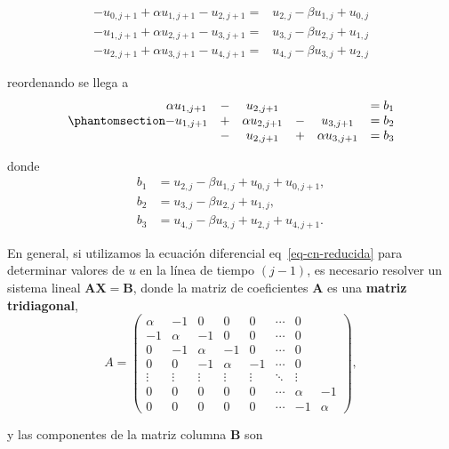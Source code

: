 \documentclass[
  spanish,
  us-letterpaper,
  DIV=11,
  numbers=noendperiod]{scrreprt}
\theoremstyle{definition}
\theoremstyle{plain}
\theoremstyle{remark}
\begin{document}
\[
\begin{split}
-u_{0,j+1} + \alpha u_{1,j+1} - u_{2,j+1} =& u_{2,j} - \beta u_{1,j} + u_{0,j} \\
-u_{1,j+1} + \alpha u_{2,j+1} - u_{3,j+1} =& u_{3,j} - \beta u_{2,j} + u_{1,j} \\
-u_{2,j+1} + \alpha u_{3,j+1} - u_{4,j+1} =& u_{4,j} - \beta u_{3,j} + u_{2,j}
\end{split}
\]

reordenando se llega a
\begin{equation}\phantomsection\label{eq-cn-matrix}{
\begin{matrix}
\alpha u_{1,j+1} &-& u_{2,j+1}&& &= b_1 \\
-u_{1,j+1} &+& \alpha u_{2,j+1} &-& u_{3,j+1} &= b_2 \\
&-&u_{2,j+1} &+& \alpha u_{3,j+1} &= b_3
\end{matrix}
}\end{equation}

donde \begin{align*}
b_1 &= u_{2,j} - \beta u_{1,j} + u_{0,j} + u_{0,j+1}, \\
b_2 &= u_{3,j} - \beta u_{2,j} + u_{1,j}, \\
b_3 &= u_{4,j} - \beta u_{3,j} + u_{2,j} + u_{4,j+1}.
\end{align*}

En general, si utilizamos la ecuación diferencial
eq~\ref{eq-cn-reducida} para determinar valores de \(u\) en la línea de
tiempo \((j -1)\), es necesario resolver un sistema lineal
\(\mathbf{AX=B}\), donde la matriz de coeficientes \(\mathbf{A}\) es una
\textbf{matriz tridiagonal}, \[
A = 
\begin{pmatrix}
\alpha & -1    & 0      & 0      & 0      & \cdots & 0      \\
-1     & \alpha & -1     & 0      & 0      & \cdots & 0      \\
0      & -1     & \alpha & -1     & 0      & \cdots & 0      \\
0      & 0      & -1     & \alpha & -1     & \cdots & 0      \\
\vdots & \vdots & \vdots & \vdots & \vdots & \ddots & \vdots \\
0      & 0      & 0      & 0      & 0      & \cdots & \alpha & -1 \\
0      & 0      & 0      & 0      & 0      & \cdots & -1     & \alpha
\end{pmatrix},
\]

y las componentes de la matriz columna \(\mathbf{B}\) son
\end{document}
